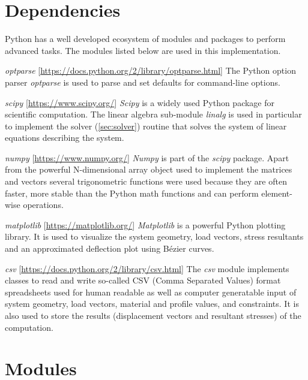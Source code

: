 \section{Dependencies}
\label{sec:depend}

Python has a well developed ecosystem of modules and packages to perform advanced tasks.
The modules listed below are used in this implementation.
\bigskip
 
\textit{optparse} [\url{https://docs.python.org/2/library/optparse.html}] \linebreak
The Python option parser \textit{optparse} is used to parse and set defaults for command-line options.
\bigskip

\textit{scipy} [\url{https://www.scipy.org/}]\linebreak
\textit{Scipy} is a widely used Python package for scientific computation. The linear algebra sub-module \textit{linalg} is used in particular to implement the solver (\cref{sec:solver}) routine that solves the system of linear equations describing the system.
\bigskip

\textit{numpy} [\url{https://www.numpy.org/}]\linebreak
\textit{Numpy} is part of the \textit{scipy} package. Apart from the powerful N-dimensional array object used to implement the matrices and vectors several trigonometric functions were used because they are often faster, more stable than the Python math functions and can perform element-wise operations.
\bigskip

\textit{matplotlib} [\url{https://matplotlib.org/}]\linebreak
\textit{Matplotlib} is a powerful Python plotting library. It is used to visualize the system geometry, load vectors, stress resultants and an approximated deflection plot using B\'{e}zier curves.
\bigskip

\textit{csv} [\url{https://docs.python.org/2/library/csv.html}]\linebreak
The \textit{csv} module implements classes to read and write so-called CSV (Comma Separated Values) format spreadsheets used for human readable as well as computer generatable input of system geometry, load vectors, material and profile values, and constraints.
It is also used to store the results (displacement vectors and resultant stresses) of the computation.

\pagebreak

\section{Modules}
\label{sec:modules}


